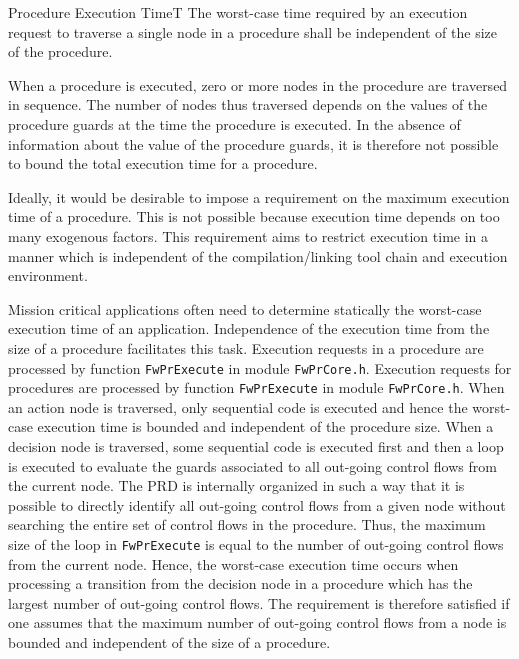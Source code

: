 \documentclass[requirements]{../fwprofile}
\begin{document}
\begin{fw_req_note}{Procedure Execution Time}{T}
{The worst-case time required by an execution request
to traverse a single node in a procedure shall be independent of the size of the 
procedure.}
{When a procedure is executed, zero or more nodes in the procedure
are traversed in sequence. The number of nodes thus traversed depends on the
values of the procedure guards at the time the procedure is executed.
In the absence of information about the value of the procedure guards, it is 
therefore not possible to bound the total execution time for a procedure.

Ideally, it would be desirable to impose a requirement on the 
maximum execution time of a procedure.
This is not possible because execution time depends on too many exogenous factors. 
This requirement aims to restrict execution time in a manner which is 
independent of the compilation/linking tool chain and execution environment.}
{Mission critical applications often need to determine 
statically the worst-case execution time of an application. 
Independence of the execution time from the size of a procedure facilitates this task.}
{Execution requests in a procedure are processed by function 
\texttt{FwPrExecute} in module \texttt{FwPrCore.h}.}
{Execution requests for procedures are processed by function 
\texttt{FwPrExecute} in module \texttt{FwPrCore.h}. 
When an action node is traversed, only sequential code is executed and hence the
worst-case execution time is bounded and independent of the procedure size.
When a decision node is traversed, some sequential code is executed first and 
then a loop is executed to evaluate the guards associated to all out-going control flows
from the current node. 
The PRD is internally organized in such a way that it is possible to directly identify 
all out-going control flows from a given node without searching the entire set of control flows 
in the procedure. 
Thus, the maximum size of the loop in \texttt{FwPrExecute} 
is equal to the number of out-going control flows from the current node. 
Hence, the worst-case execution time occurs when processing a transition from the decision
node in a procedure which has the largest number of out-going control flows. 
The requirement is therefore satisfied 
if one assumes that the maximum number of out-going control flows from a node is bounded 
and independent of the size of a procedure.}
\end{fw_req_note}
\end{document}
